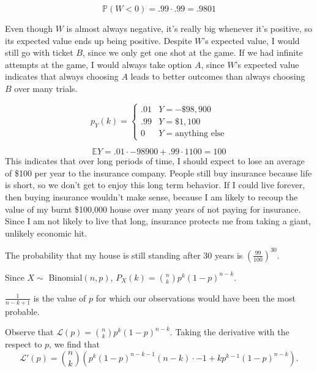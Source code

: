 \documentclass[12pt]{article}
\begin{document}
\medskip
{}

    $$\mathbb P(W < 0) = .99 \cdot .99 = .9801$$

\medskip
{}

    Even though $W$ is almost always negative, it's really big whenever it's positive, so its expected value ends up being positive. Despite $W$'s expected value, I would still go with ticket $B$, since we only get one shot at the game. If we had infinite attempts at the game, I would always take option $A$, since $W$'s expected value indicates that always choosing $A$ leads to better outcomes than always choosing $B$ over many trials.

\newpage
{}


    $$p_Y(k) = \begin{cases}
        .01 & Y = -\$98,900 \\
        .99 & Y = \$1,100 \\
        0   & Y = \text{anything else}
    \end{cases}$$

\medskip
{}

    $$\mathbb EY = .01 \cdot -98900 + .99 \cdot 1100 = 100$$
    This indicates that over long periods of time, I should expect to lose an average of \$100 per year to the insurance company. People still buy insurance because life is short, so we don't get to enjoy this long term behavior. If I could live forever, then buying insurance wouldn't make sense, because I am likely to recoup the value of my burnt \$100,000 house over many years of not paying for insurance. Since I am not likely to live that long, insurance protects me from taking a giant, unlikely economic hit.

\medskip
{}

    The probability that my house is still standing after 30 years is $(\frac{99}{100})^{30}$.

\newpage
{}


    Since $X \sim$ Binomial$(n, p)$, $P_X(k) = {n \choose k}p^k(1-p)^{n-k}$.
    
    $\frac1{n-k+1}$ is the value of $p$ for which our observations would have been the most probable.
    
    Observe that $\mathcal L(p) = {n \choose k}p^k(1-p)^{n-k}$. Taking the derivative with the respect to $p$, we find that $$\mathcal L'(p) = {n \choose k}(p^k(1-p)^{n-k-1}(n-k)\cdot-1+kp^{k-1}(1-p)^{n-k}).$$
\end{document}
